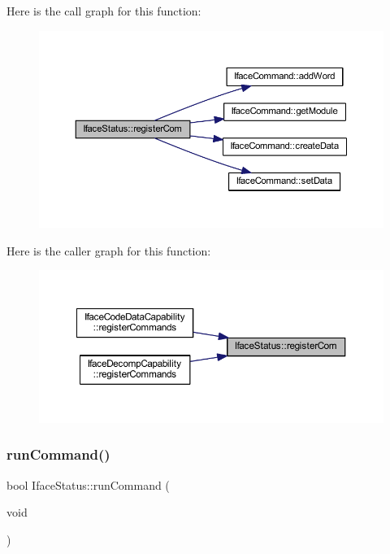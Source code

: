 Here is the call graph for this function\+:
\nopagebreak
\begin{figure}[H]
\begin{center}
\leavevmode
\includegraphics[width=350pt]{class_iface_status_ad4fec227b244e8242fef9d36020a76fa_cgraph}
\end{center}
\end{figure}
Here is the caller graph for this function\+:
\nopagebreak
\begin{figure}[H]
\begin{center}
\leavevmode
\includegraphics[width=350pt]{class_iface_status_ad4fec227b244e8242fef9d36020a76fa_icgraph}
\end{center}
\end{figure}
\mbox{\label{class_iface_status_a78057db3e8cbf3c50cd1a6e4312892e5}} 
\subsubsection{\texorpdfstring{runCommand()}{runCommand()}}
{\footnotesize\ttfamily bool Iface\+Status\+::run\+Command (\begin{DoxyParamCaption}\item[{void}]{ }\end{DoxyParamCaption})}



